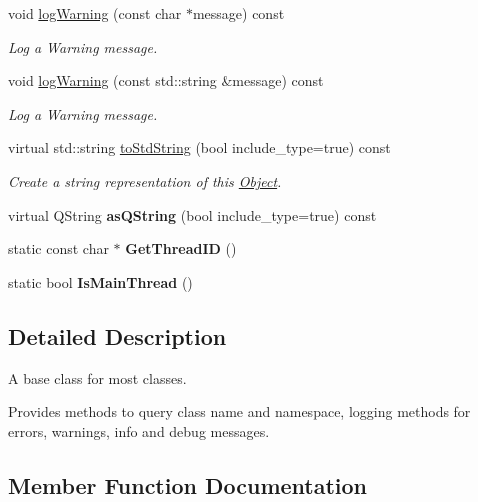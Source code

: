 \begin{DoxyCompactItemize}
void \mbox{\hyperlink{classrev_1_1_object_aade231ca725d4b022a99c045bac03256}{log\+Warning}} (const char $\ast$message) const
\begin{DoxyCompactList}\small\item\em Log a Warning message. \end{DoxyCompactList}\item 
void \mbox{\hyperlink{classrev_1_1_object_a7360cf1180eaa4a71dc0d76d77b266a9}{log\+Warning}} (const std\+::string \&message) const
\begin{DoxyCompactList}\small\item\em Log a Warning message. \end{DoxyCompactList}\item 
virtual std\+::string \mbox{\hyperlink{classrev_1_1_object_a825ec2ff288b47272e733b1500c2798a}{to\+Std\+String}} (bool include\+\_\+type=true) const
\begin{DoxyCompactList}\small\item\em Create a string representation of this \mbox{\hyperlink{classrev_1_1_object}{Object}}. \end{DoxyCompactList}\item 
\mbox{\label{classrev_1_1_object_ab60baae84703ab1526cc05513edd93f8}} 
virtual Q\+String {\bfseries as\+Q\+String} (bool include\+\_\+type=true) const
\item 
\mbox{\label{classrev_1_1_object_a8c2cef80f2b00275d34d8df98c0120f8}} 
static const char $\ast$ {\bfseries Get\+Thread\+ID} ()
\item 
\mbox{\label{classrev_1_1_object_adce3b08bbedbee210d1f4b05c8e3a441}} 
static bool {\bfseries Is\+Main\+Thread} ()
\end{DoxyCompactItemize}


\subsection{Detailed Description}
A base class for most classes. 

Provides methods to query class name and namespace, logging methods for errors, warnings, info and debug messages. 

\subsection{Member Function Documentation}
\mbox{\label{classrev_1_1_object_a7a2013f91169479b65cf93afdc5d9a68}} 

